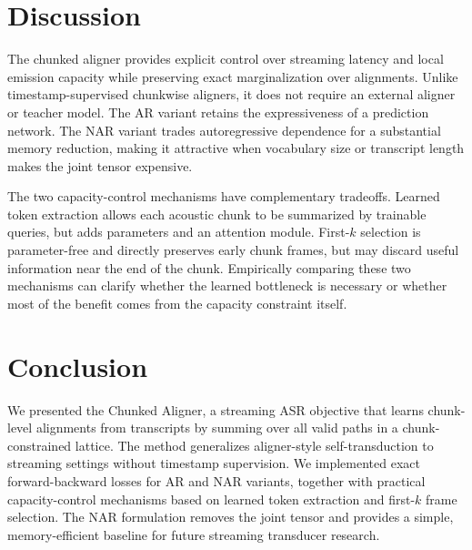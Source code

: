 \documentclass[conference]{IEEEtran}
\begin{document}
\section{Discussion}

The chunked aligner provides explicit control over streaming latency and local
emission capacity while preserving exact marginalization over alignments. Unlike
timestamp-supervised chunkwise aligners, it does not require an external aligner
or teacher model. The AR variant retains the expressiveness of a prediction
network. The NAR variant trades autoregressive dependence for a substantial
memory reduction, making it attractive when vocabulary size or transcript length
makes the joint tensor expensive.

The two capacity-control mechanisms have complementary tradeoffs. Learned token
extraction allows each acoustic chunk to be summarized by trainable queries, but
adds parameters and an attention module. First-$k$ selection is parameter-free and
directly preserves early chunk frames, but may discard useful information near the
end of the chunk. Empirically comparing these two mechanisms can clarify whether
the learned bottleneck is necessary or whether most of the benefit comes from the
capacity constraint itself.

\section{Conclusion}

We presented the Chunked Aligner, a streaming ASR objective that learns
chunk-level alignments from transcripts by summing over all valid paths in a
chunk-constrained lattice. The method generalizes aligner-style self-transduction
to streaming settings without timestamp supervision. We implemented exact
forward-backward losses for AR and NAR variants, together with practical
capacity-control mechanisms based on learned token extraction and first-$k$ frame
selection. The NAR formulation removes the joint tensor and provides a simple,
memory-efficient baseline for future streaming transducer research.
\end{document}
